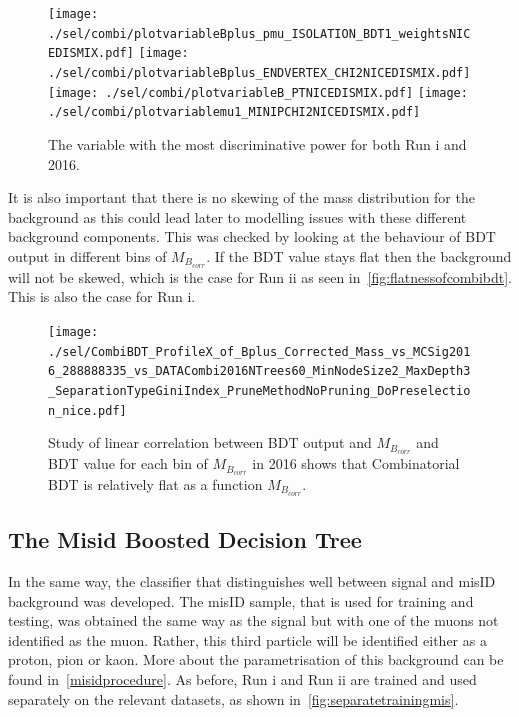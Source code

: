 \begin{figure}[ht]
\centering
	\texttt{[image: ./sel/combi/plotvariableBplus\_pmu\_ISOLATION\_BDT1\_weightsNICEDISMIX.pdf]}%
	\texttt{[image: ./sel/combi/plotvariableBplus\_ENDVERTEX\_CHI2NICEDISMIX.pdf]}%
	\newline
	\texttt{[image: ./sel/combi/plotvariableB\_PTNICEDISMIX.pdf]}%
	\texttt{[image: ./sel/combi/plotvariablemu1\_MINIPCHI2NICEDISMIX.pdf]}%
	\caption{The variable with the most discriminative power for both Run \Rn{1} and 2016.}
\label{fig:discombi}
\end{figure}


It is also important that there is no skewing of the mass distribution for the background as this could lead later to modelling issues with these different background components. This was checked by looking at the behaviour of BDT output in different bins of $M_{B_{corr}}$. If the BDT value stays flat then the background will not be skewed, which is the case for Run \Rn{2} as seen in~\autoref{fig:flatnessofcombibdt}. This is also the case for Run \Rn{1}. 


\begin{figure}[ht]
\centering
	\texttt{[image: ./sel/CombiBDT\_ProfileX\_of\_Bplus\_Corrected\_Mass\_vs\_MCSig2016\_288888335\_vs\_DATACombi2016NTrees60\_MinNodeSize2\_MaxDepth3\_SeparationTypeGiniIndex\_PruneMethodNoPruning\_DoPreselection\_nice.pdf]}
\caption{Study of linear correlation between BDT output and $M_{B_{corr}}$ and BDT value for each bin of $M_{B_{corr}}$ in 2016 shows that Combinatorial BDT is relatively flat as a function $M_{B_{corr}}$.}
\label{fig:flatnessofcombibdt}
\end{figure}

\subsection{The Misid Boosted Decision Tree}
\label{misidbdt}
In the same way, the classifier that distinguishes well between signal and misID background was developed. The misID sample, that is used for training and testing, was obtained the same way as the signal but with one of the muons not identified as the muon. Rather, this third particle will be identified either as a proton, pion or kaon. More about the parametrisation of this background can be found in~\autoref{misidprocedure}. As before, Run \Rn{1} and Run \Rn{2} are trained and used separately on the relevant datasets, as shown in~\autoref{fig:separatetrainingmis}. 



